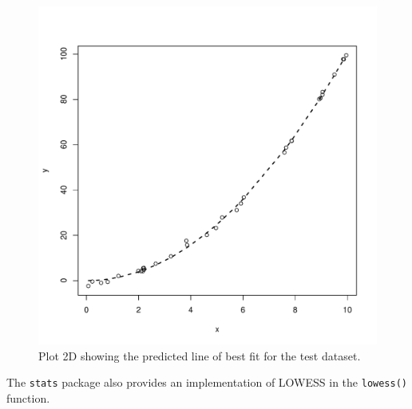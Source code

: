 

\begin{figure}[htp]
\centering
\includegraphics[scale=0.45]{a_regression/locally_estimated_scatterplot_smoothing_result.pdf}
\caption{Plot 2D showing the predicted line of best fit for the test dataset.}
\label{plot:locally_estimated_scatterplot_smoothing_result}
\end{figure}

The \texttt{stats} package also provides an implementation of LOWESS in the \texttt{lowess()} function.

